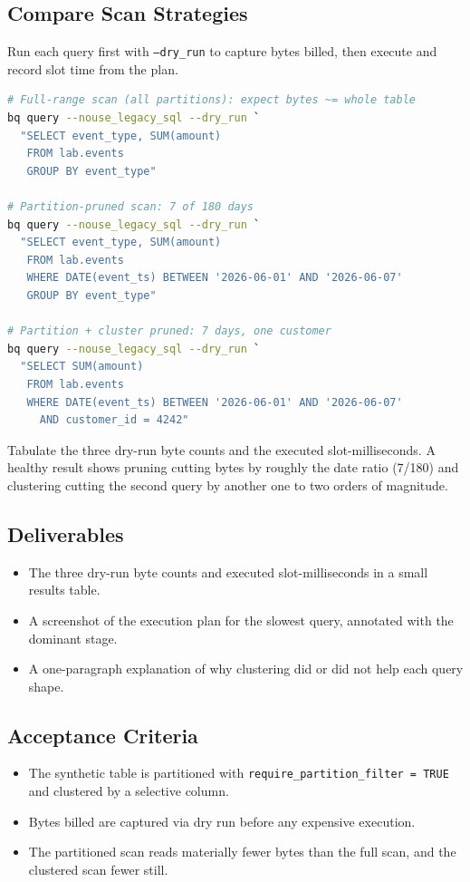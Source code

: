 \subsection{Compare Scan Strategies}
Run each query first with \texttt{--dry\_run} to capture bytes billed, then execute and record slot time from the plan.

\begin{lstlisting}[language=bash,caption={Dry-run comparison of full, partitioned, and clustered scans.}]
# Full-range scan (all partitions): expect bytes ~= whole table
bq query --nouse_legacy_sql --dry_run `
  "SELECT event_type, SUM(amount)
   FROM lab.events
   GROUP BY event_type"

# Partition-pruned scan: 7 of 180 days
bq query --nouse_legacy_sql --dry_run `
  "SELECT event_type, SUM(amount)
   FROM lab.events
   WHERE DATE(event_ts) BETWEEN '2026-06-01' AND '2026-06-07'
   GROUP BY event_type"

# Partition + cluster pruned: 7 days, one customer
bq query --nouse_legacy_sql --dry_run `
  "SELECT SUM(amount)
   FROM lab.events
   WHERE DATE(event_ts) BETWEEN '2026-06-01' AND '2026-06-07'
     AND customer_id = 4242"
\end{lstlisting}

Tabulate the three dry-run byte counts and the executed slot-milliseconds. A healthy result shows pruning cutting bytes by roughly the date ratio (7/180) and clustering cutting the second query by another one to two orders of magnitude.

\subsection*{Deliverables}
\begin{itemize}
    \item The three dry-run byte counts and executed slot-milliseconds in a small results table.
    \item A screenshot of the execution plan for the slowest query, annotated with the dominant stage.
    \item A one-paragraph explanation of why clustering did or did not help each query shape.
\end{itemize}

\subsection*{Acceptance Criteria}
\begin{itemize}
    \item The synthetic table is partitioned with \texttt{require\_partition\_filter = TRUE} and clustered by a selective column.
    \item Bytes billed are captured via dry run before any expensive execution.
    \item The partitioned scan reads materially fewer bytes than the full scan, and the clustered scan fewer still.
\end{itemize}

